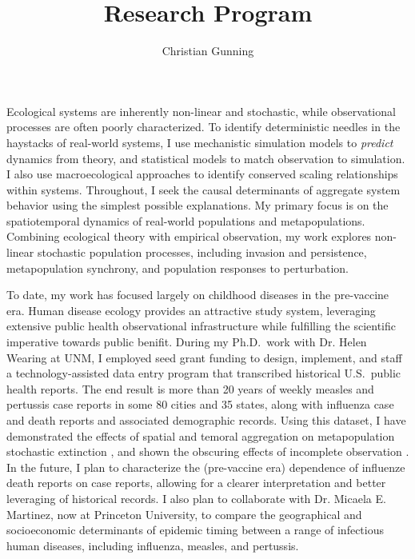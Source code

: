 \documentclass[12pt]{article}
\author{Christian Gunning}
\title{Research Program}
\begin{document}
\maketitle
\thispagestyle{empty}
\linespread{1.25}\selectfont

Ecological systems are inherently non-linear and stochastic, while observational
processes are often poorly characterized.  To identify deterministic needles in
the haystacks of real-world systems, I use 
mechanistic simulation models to {\em predict} dynamics from theory, and
statistical models to match observation to simulation. I also use
macroecological approaches to identify conserved scaling relationships
within systems. Throughout, I seek the causal determinants of aggregate 
system behavior using the simplest possible explanations.
My primary focus is on the spatiotemporal dynamics of real-world 
populations and metapopulations. Combining ecological theory with 
empirical observation, my work explores non-linear stochastic 
population processes,
including invasion and persistence, metapopulation synchrony,
and population responses to perturbation.



To date, my work has focused largely on childhood diseases in the pre-vaccine
era. Human disease ecology provides an attractive study system, leveraging
extensive public health observational infrastructure while fulfilling the scientific
imperative towards public benifit. During my Ph.D.\ work with Dr. Helen Wearing
at UNM, I employed seed grant funding to design, implement, and staff a
technology-assisted data entry program that transcribed historical U.S.\ public
health reports. The end result is more than 20 years of weekly measles and
pertussis case reports in some 80 cities and 35 states, along with influenza
case and death reports and associated demographic records.  Using this
dataset, I have demonstrated the effects of spatial and temoral aggregation on
metapopulation stochastic extinction \citep{gunning2013probabilistic},
and shown the obscuring effects of incomplete observation \citep{gunning2014conserved}. 
In the future, I plan to characterize the (pre-vaccine era) dependence of influenze
death reports on case reports, allowing for a clearer interpretation and better
leveraging of historical records. I also plan to collaborate with Dr.
Micaela E. Martinez, now at Princeton University, to compare the geographical
and socioeconomic determinants of epidemic timing between a range of 
infectious human diseases, including influenza, measles, and pertussis.
\end{document}
